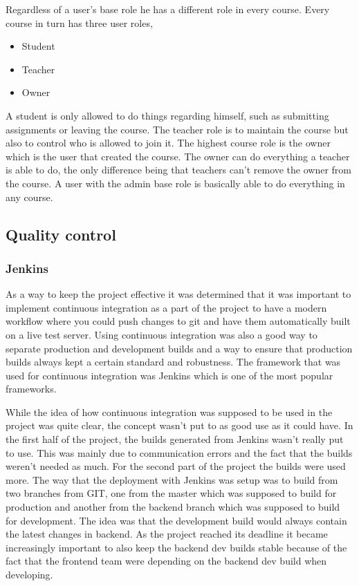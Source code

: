 Regardless of a user's base role he has a different role in every course. Every course in turn has three user roles,
\begin{itemize}
\item Student
\item Teacher
\item Owner
\end{itemize}
A student is only allowed to do things regarding himself, such as submitting assignments or leaving the course. The teacher role is to maintain the course but also to control who is allowed to join it. The highest course role is the owner which is the user that created the course. The owner can do everything a teacher is able to do, the only difference being that teachers can't remove the owner from the course. A user with the admin base role is basically able to do everything in any course.

\subsection{Quality control}
\subsubsection{Jenkins}
As a way to keep the project effective it was determined that it was important to implement continuous integration as a part of the project to have a modern workflow where you could push changes to git and have them automatically built on a live test server. Using continuous integration was also a good way to separate production and development builds and a way to ensure that production builds always kept a certain standard and robustness. The framework that was used for continuous integration was Jenkins which is one of the most popular frameworks.

While the idea of how continuous integration was supposed to be used in the project was quite clear, the concept wasn't put to as good use as it could have. In the first half of the project, the builds generated from Jenkins wasn't really put to use. This was mainly due to communication errors and the fact that the builds weren't needed as much. For the second part of the project the builds were used more. The way that the deployment with Jenkins was setup was to build from two branches from GIT, one from the master which was supposed to build for production and another from the backend branch which was supposed to build for development. The idea was that the development build would always contain the latest changes in backend. As the project reached its deadline it became increasingly important to also keep the backend dev builds stable because of the fact that the frontend team were depending on the backend dev build when developing.

